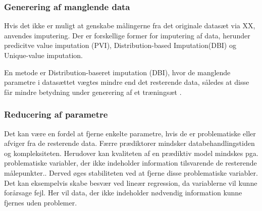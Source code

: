 \subsubsection{Generering af manglende data}
Hvis det ikke er muligt at genskabe målingerne fra det originale datasæt via XX, anvendes imputering. Der er forskellige former for imputering af data, herunder predicitve value imputation (PVI), Distribution-based Imputation(DBI) og Unique-value imputation. 



En metode er Distribution-baseret imputation (DBI), hvor de manglende parametre i datasættet vægtes mindre end det resterende data, således at disse får mindre betydning under generering af et træningsæt \cite{Saar2007}. 






\subsubsection{Reducering af parametre}\label{reduceringafparametre}
Det kan være en fordel at fjerne enkelte parametre, hvis de er problematiske eller afviger fra de resterende data. Færre prædiktorer mindsker databehandlingstiden og kompleksiteten. Herudover kan kvaliteten af en prædiktiv model mindskes pga. problematiske variabler, der ikke indeholder information tilsvarende de resterende målepunkter.. Derved øges stabiliteten ved at fjerne disse problematiske variabler. Det kan eksempelvis skabe besvær ved lineær regression, da variablerne vil kunne forårsage fejl. Her vil data, der ikke indeholder nødvendig information kunne fjernes uden problemer.\cite{Kuhn2013}
 

